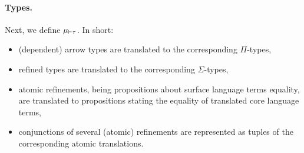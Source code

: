 \documentclass[a4paper]{article}
\begin{document}
\paragraph{Types.}
Next, we define $\mu_{\vdash\tau}$. In short:
\begin{itemize}
  \item (dependent) arrow types are translated to the corresponding $\Pi$-types,
  \item refined types are translated to the corresponding $\Sigma$-types,
  \item atomic refinements, being propositions about surface language terms equality,
    are translated to propositions stating the equality of translated core language terms,
  \item conjunctions of several (atomic) refinements are represented as tuples of the corresponding atomic translations.
\end{itemize}
\end{document}
